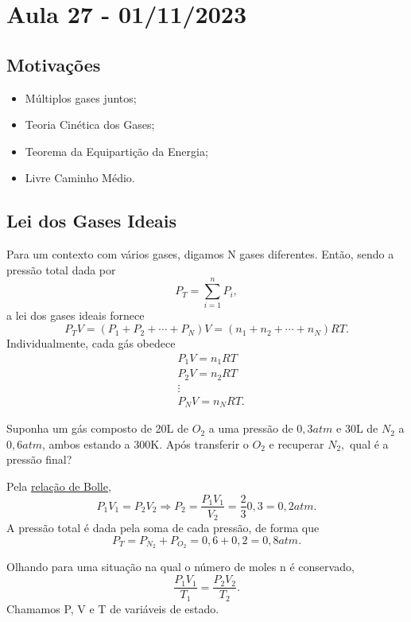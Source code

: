 \documentclass[PhysicsII/phsyicsII_notes.tex]{subfiles}
\begin{document}
\section{Aula 27 - 01/11/2023}
\subsection{Motivações}
\begin{itemize}
	\item Múltiplos gases juntos;
	\item Teoria Cinética dos Gases;
	\item Teorema da Equipartição da Energia;
	\item Livre Caminho Médio.
\end{itemize}
\subsection{Lei dos Gases Ideais}
Para um contexto com vários gases, digamos N gases diferentes. Então, sendo a pressão total dada por
\[
	P_{T} = \sum\limits_{i=1}^{n}P_{i},
\]
a lei dos gases ideais fornece
\[
	P_{T}V = (P_{1} + P_{2} + \cdots + P_{N})V = (n_{1} + n_{2} + \cdots + n_{N})RT.
\]
Individualmente, cada gás obedece
\begin{align*}
	 & P_{1}V = n_{1}RT  \\
	 & P_{2}V = n_{2}RT  \\
	 & \vdots            \\
	 & P_{N}V = n_{N}RT.
\end{align*}
\begin{example}
	Suponha um gás composto de 20L de \(O_{2}\) a uma pressão de \(0,3atm\) e 30L de \(N_{2}\) a \(0,6atm\), ambos estando
	a 300K. Após transferir o \(O_{2}\) e recuperar \(N_{2},\) qual é a pressão final?

	Pela \hyperlink{boyle}{relação de Bolle},
	\[
		P_{1}V_{1} = P_{2}V_{2} \Rightarrow P_{2} = \frac{P_{1}V_{1}}{V_{2}} = \frac{2}{3}0,3 = 0,2atm.
	\]
	A pressão total é dada pela soma de cada pressão, de forma que
	\[
		P_{T} = P_{N_{2}} + P_{O_{2}} = 0,6 + 0,2 = 0,8atm.
	\]
\end{example}

Olhando para uma situação na qual o número de moles n é conservado,
\[
	\frac{P_{1}V_{1}}{T_{1}} = \frac{P_{2}V_{2}}{T_{2}}.
\]
Chamamos P, V e T de variáveis de estado.
\end{document}
